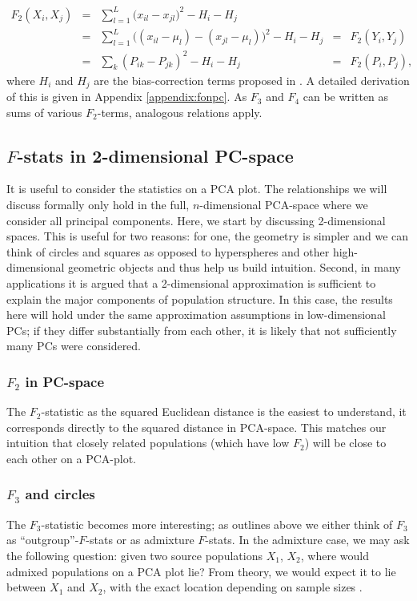 \documentclass[10pt,a4paper]{article}
\begin{document}
\begin{align}
F_2(X_i, X_j) &=&  \sum_{l=1}^L \big( x_{il} -x_{jl}\big)^2 - H_i - H_j &&\nonumber\\ 
 &=& \sum_{l=1}^L \big( (x_{il} - \mu_l) -(x_{jl} -\mu_l)\big)^2 - H_i - H_j  &=& F_2(Y_i, Y_j) \nonumber\\
 &=& \sum_k (P_{ik} - P_{jk})^2 - H_i - H_j &=& F_2(P_i, P_j) \text{,}
\end{align}
where $H_i$ and $H_j$ are the bias-correction terms proposed in \cite{reich2009}. A detailed derivation of this is given in Appendix \ref{appendix:fonpc}.
As $F_3$ and $F_4$ can be written as sums of various $F_2$-terms, analogous relations apply.

\subsection{$F$-stats in 2-dimensional PC-space}
 It is useful to consider the statistics on a PCA plot. The relationships we will discuss formally only hold in the full, $n$-dimensional PCA-space where we consider all principal components. Here, we start by discussing 2-dimensional spaces. This is useful for two reasons: for one, the geometry is simpler and we can think of circles and squares as opposed to hyperspheres and other high-dimensional geometric objects and thus help us build intuition. Second, in many applications it is argued that a 2-dimensional approximation is sufficient to explain the major components of population structure. In this case, the results here will hold under the same approximation assumptions in low-dimensional PCs; if they differ substantially from each other, it is likely that not sufficiently many PCs were considered.


\subsubsection{$F_2$ in PC-space}
The $F_2$-statistic as the squared Euclidean distance is the easiest to understand, it corresponds directly to the squared distance in PCA-space. This matches our intuition that closely related populations (which have low $F_2$) will be close to each other on a PCA-plot.

\subsubsection{$F_3$ and circles}
The $F_3$-statistic becomes more interesting; as outlines above we either think of $F_3$ as ``outgroup''-$F$-stats or as admixture $F$-stats. In the admixture case, we may ask the following question: given two source populations $X_1$, $X_2$, where would admixed populations on a PCA plot lie? From theory, we would expect it to lie between $X_1$ and $X_2$, with the exact location depending on sample sizes \cite{brisbin2012, mcvean2009}. 
\end{document}

